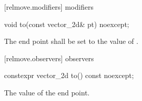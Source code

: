  [relmove.modifiers]{ modifiers}

\begin{itemdecl}
void to(const vector_2d& pt) noexcept;
\end{itemdecl}
\begin{itemdescr}
\pnum
\effects
The end point shall be set to the value of .
\end{itemdescr}

 [relmove.observers]{ observers}

\begin{itemdecl}
constexpr vector_2d to() const noexcept;
\end{itemdecl}
\begin{itemdescr}
\pnum
\returns
The value of the end point.
\end{itemdescr}
